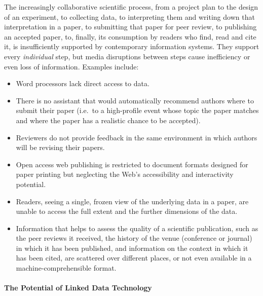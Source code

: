 \documentclass[a4paper,UKenglish]{dagrep}
\begin{document}
The increasingly collaborative scientific process, from a project plan to the
design of an experiment, to collecting data, to interpreting them and writing
down that interpretation in a paper, to submitting that paper for peer review,
to publishing an accepted paper, to, finally, its consumption by readers who
find, read and cite it, is insufficiently supported by contemporary information
systems.
They support every \emph{individual} step, but media disruptions between steps
cause inefficiency or even loss of information.
Examples include:
\begin{itemize}
\item Word processors lack direct access to data.
\item There is no assistant that would automatically recommend authors where to
submit their paper (i.e.\ to a high-profile event whose topic the paper matches
and where the paper has a realistic chance to be accepted).
\item Reviewers do not provide feedback in the same environment in which authors
will be revising their papers.
\item Open access web publishing is restricted to document formats designed for
paper printing but neglecting the Web's accessibility and interactivity potential.
\item Readers, seeing a single, frozen view of the underlying data in a paper,
are unable to access the full extent and the further dimensions of the data.
\item Information that helps to assess the quality of a scientific publication,
such as the peer reviews it received, the history of the venue (conference or
journal) in which it has been published, and information on the context in which
it has been cited, are scattered over different places, or not even available in
a machine-comprehensible format.
\end{itemize}

\paragraph{The Potential of Linked Data Technology}
\end{document}
